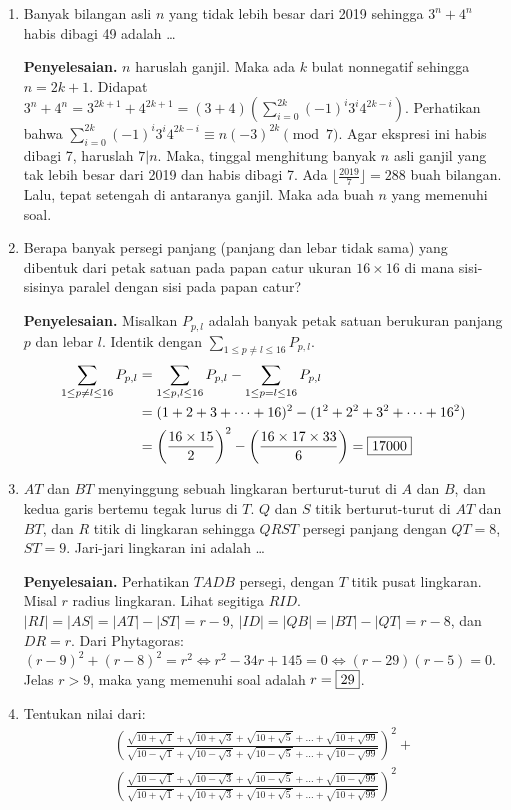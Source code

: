 \documentclass[12pt]{scrartcl}
\begin{document}
\begin{enumerate}
    \item Banyak bilangan asli $n$ yang tidak lebih besar dari 2019 sehingga $3^n+4^n$ habis dibagi 49 adalah \dots
    
    \textbf{Penyelesaian.} $n$ haruslah ganjil. Maka ada $k$ bulat nonnegatif sehingga $n=2k+1$. Didapat $3^n+4^n = 3^{2k+1}+4^{2k+1} = (3+4)(\sum_{i=0}^{2k}(-1)^i 3^i 4^{2k-i})$. Perhatikan bahwa $\sum_{i=0}^{2k}(-1)^i 3^i 4^{2k-i} \equiv n(-3)^{2k} \pmod{7}$. Agar ekspresi ini habis dibagi 7, haruslah $7|n$.
    Maka, tinggal menghitung banyak $n$ asli ganjil yang tak lebih besar dari 2019 dan habis dibagi 7. Ada $\lfloor\frac{2019}{7}\rfloor = 288$ buah bilangan. Lalu, tepat setengah di antaranya ganjil. Maka ada  buah $n$ yang memenuhi soal.
    
    \item Berapa banyak persegi panjang (panjang dan lebar tidak sama) yang dibentuk dari petak satuan pada papan catur ukuran $16 \times 16$ di mana sisi-sisinya paralel dengan sisi pada papan catur?
    
    \textbf{Penyelesaian.} Misalkan $P_{p,l}$ adalah banyak petak satuan berukuran panjang $p$ dan lebar $l$. Identik dengan $\sum_{1\le p \ne l \le 16} P_{p,l}$.
    \begin{align*}
        \sum_{1 \le p \ne l \le 16} P_{p,l} &= \sum_{1 \le p,l \le 16} P_{p,l} - \sum_{1 \le p=l \le 16} P_{p,l} \\
        &= (1+2+3+\dots+16)^2 - (1^2+2^2+3^2+\dots+16^2) \\
        &= \left(\frac{16 \times 15}{2}\right)^2 - \left(\frac{16 \times 17 \times 33}{6}\right) = \fbox{17000}
    \end{align*}
    
    \item $AT$ dan $BT$ menyinggung sebuah lingkaran berturut-turut di $A$ dan $B$, dan kedua garis bertemu tegak lurus di $T$. $Q$ dan $S$ titik berturut-turut di $AT$ dan $BT$, dan $R$ titik di lingkaran sehingga $QRST$ persegi panjang dengan $QT=8$, $ST=9$. Jari-jari lingkaran ini adalah \dots
    
    \textbf{Penyelesaian.} Perhatikan $TADB$ persegi, dengan $T$ titik pusat lingkaran. Misal $r$ radius lingkaran. Lihat segitiga $RID$. $|RI|=|AS|=|AT|-|ST|=r-9$, $|ID|=|QB|=|BT|-|QT|=r-8$, dan $DR=r$. Dari Phytagoras:
    $(r-9)^2+(r-8)^2 = r^2 \iff r^2-34r+145 = 0 \iff (r-29)(r-5) = 0$.
    Jelas $r>9$, maka yang memenuhi soal adalah $r=\fbox{29}$.
    
    \item Tentukan nilai dari:
    \begin{align*}
        \left(\frac{\sqrt{10+\sqrt{1}}+\sqrt{10+\sqrt{3}}+\sqrt{10+\sqrt{5}}+\dots+\sqrt{10+\sqrt{99}}}{\sqrt{10-\sqrt{1}}+\sqrt{10-\sqrt{3}}+\sqrt{10-\sqrt{5}}+\dots+\sqrt{10-\sqrt{99}}}\right)^2 +\\ \left(\frac{\sqrt{10-\sqrt{1}}+\sqrt{10-\sqrt{3}}+\sqrt{10-\sqrt{5}}+\dots+\sqrt{10-\sqrt{99}}}{\sqrt{10+\sqrt{1}}+\sqrt{10+\sqrt{3}}+\sqrt{10+\sqrt{5}}+\dots+\sqrt{10+\sqrt{99}}}\right)^2 
    \end{align*}
    

\end{enumerate}
\end{document}
